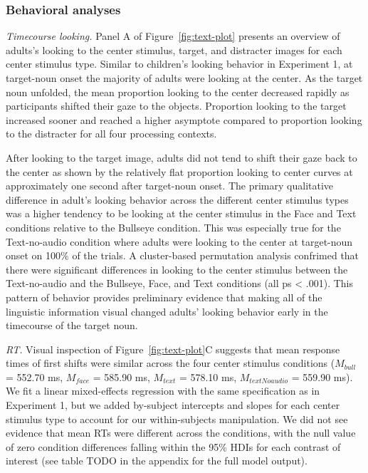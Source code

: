 \documentclass[english,floatsintext,man]{apa6}
\begin{document}
\hypertarget{behavioral-analyses-1}{%
\subsubsection{Behavioral analyses}\label{behavioral-analyses-1}}

\emph{Timecourse looking.} Panel A of Figure~\ref{fig:text-plot}
presents an overview of adults's looking to the center stimulus, target,
and distracter images for each center stimulus type. Similar to
children's looking behavior in Experiment 1, at target-noun onset the
majority of adults were looking at the center. As the target noun
unfolded, the mean proportion looking to the center decreased rapidly as
participants shifted their gaze to the objects. Proportion looking to
the target increased sooner and reached a higher asymptote compared to
proportion looking to the distracter for all four processing contexts.

After looking to the target image, adults did not tend to shift their
gaze back to the center as shown by the relatively flat proportion
looking to center curves at approximately one second after target-noun
onset. The primary qualitative difference in adult's looking behavior
across the different center stimulus types was a higher tendency to be
looking at the center stimulus in the Face and Text conditions relative
to the Bullseye condition. This was especially true for the
Text-no-audio condition where adults were looking to the center at
target-noun onset on 100\% of the trials. A cluster-based permutation
analysis confrimed that there were significant differences in looking to
the center stimulus between the Text-no-audio and the Bullseye, Face,
and Text conditions (all ps \textless{} .001). This pattern of behavior
provides preliminary evidence that making all of the linguistic
information visual changed adults' looking behavior early in the
timecourse of the target noun.

\emph{RT.} Visual inspection of Figure~\ref{fig:text-plot}C suggests
that mean response times of first shifts were similar across the four
center stimulus conditions (\(M_{bull}\) = 552.70 ms, \(M_{face}\) =
585.90 ms, \(M_{text}\) = 578.10 ms, \(M_{textNoaudio}\) = 559.90 ms).
We fit a linear mixed-effects regression with the same specification as
in Experiment 1, but we added by-subject intercepts and slopes for each
center stimulus type to account for our within-subjects manipulation. We
did not see evidence that mean RTs were different across the conditions,
with the null value of zero condition differences falling within the
95\% HDIs for each contrast of interest (see table TODO in the appendix
for the full model output).
\end{document}
